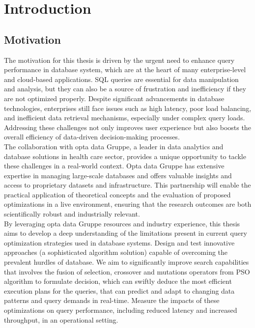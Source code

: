 \section{Introduction}
\subsection{Motivation} The motivation for this thesis is driven by the urgent need to enhance query performance in database system, which are at the heart of many enterprise-level and cloud-based applications. SQL queries are essential for data manipulation and analysis, but they can also be a source of frustration and inefficiency if they are not optimized properly. Despite significant advancements in database technologies, enterprises still face issues such as high latency, poor load balancing, and inefficient data retrieval mechanisms, especially under complex query loads. Addressing these challenges not only improves user experience but also boosts the overall efficiency of data-driven decision-making processes.\\
The collaboration with opta data Gruppe, a leader in data analytics and database solutions in health care sector, provides a unique opportunity to tackle these challenges in a real-world context. Opta data Gruppe has extensive expertise in managing large-scale databases and offers valuable insights and access to proprietary datasets and infrastructure. This partnership will enable the practical application of theoretical concepts and the evaluation of proposed optimizations in a live environment, ensuring that the research outcomes are both scientifically robust and industrially relevant.\\
By leveraging opta data Gruppe resources and industry experience, this thesis aims to develop a deep understanding of the limitations present in current query optimization strategies used in database systems. Design and test innovative approaches (a sophisticated algorithm solution) capable of overcoming the prevalent hurdles of database. We aim to significantly improve search capabilities that involves the fusion of selection, crossover and mutations operators from PSO algorithm to formulate decision, which can swiftly deduce the most efficient execution plans for the queries, that can predict and adapt to changing data patterns and query demands in real-time. Measure the impacts of these optimizations on query performance, including reduced latency and increased throughput, in an operational setting.\\

